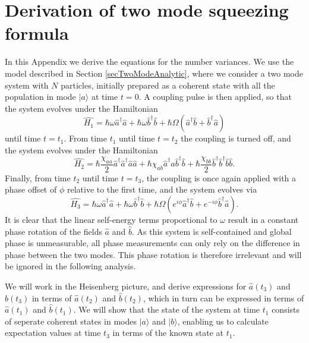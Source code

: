 \documentclass{iopart}
\begin{document}
\section{Derivation of two mode squeezing formula}
\label{appendixTwoModeDerivation}
In this Appendix we derive the equations for the number variances. We use the model described in Section \ref{secTwoModeAnalytic}, where we consider a two mode system with $N$ particles, initially prepared as a coherent state with all the population in mode $|a\rangle$ at time $t=0$. A coupling pulse is then applied, so that the system evolves under the Hamiltonian
\begin{equation}
\hat{H_1} = \hbar \omega \hat{a}^{\dagger} \hat{a} +  \hbar \omega \hat{b}^{\dagger} \hat{b} 
          + \hbar \Omega (\hat{a}^{\dagger} \hat{b} + \hat{b}^{\dagger} \hat{a} )
\end{equation}
until time $t=t_1$. From time $t_1$ until time $t=t_2$ the coupling is turned off, and the system evolves under the Hamiltonian
\begin{equation}
\hat{H_2} = \hbar\frac{\chi_{aa}}{2} \hat{a}^{\dagger} \hat{a}^{\dagger} \hat{a} \hat{a}
          + \hbar\chi_{ab} \hat{a}^{\dagger} \hat{a} \hat{b}^{\dagger} \hat{b}
          + \hbar\frac{\chi_{bb}}{2} \hat{b}^{\dagger} \hat{b}^{\dagger} \hat{b} \hat{b}.
\end{equation}
Finally, from time $t_2$ until time $t=t_3$, the coupling is once again applied with a phase offset of $\phi$ relative to the first time, and the system evolves via
\begin{equation}
\hat{H_3} = \hbar \omega \hat{a}^{\dagger} \hat{a} +  \hbar \omega \hat{b}^{\dagger} \hat{b}
          + \hbar\Omega (e^{i\phi} \hat{a}^{\dagger} \hat{b} + e^{-i\phi} \hat{b}^{\dagger} \hat{a} ).
\end{equation}
It is clear that the linear self-energy terms proportional to $\omega$ result in a constant phase rotation of the fields $\hat{a}$ and $\hat{b}$. As this system is self-contained and global phase is unmeasurable, all phase measurements can only rely on the difference in phase between the two modes. This phase rotation is therefore irrelevant and will be ignored in the following analysis.

We will work in the Heisenberg picture, and derive expressions for $\hat{a}(t_3)$ and $\hat{b}(t_3)$ in terms of $\hat{a}(t_2)$ and $\hat{b}(t_2)$, which in turn can be expressed in terms of $\hat{a}(t_1)$ and $\hat{b}(t_1)$. We will show that the state of the system at time $t_1$ consists of seperate coherent states in modes $|a\rangle$ and $|b\rangle$, enabling us to calculate expectation values at time $t_3$ in terms of the known state at $t_1$.
\end{document}

